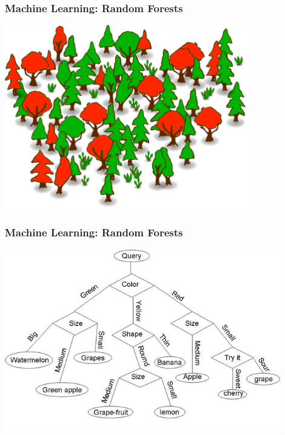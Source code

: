 \documentclass{beamer}
\begin{document}
\begin{frame}
\frametitle{Machine Learning: Random Forests\footnotemark}
\centering
\includegraphics[width=0.8\textwidth]{random_forest.png}\\
\end{frame}


\begin{frame}
\frametitle{Machine Learning: Random Forests}
\centering
\includegraphics[width=0.9\textwidth]{rf.jpeg}\\
\end{frame}


\end{document}
